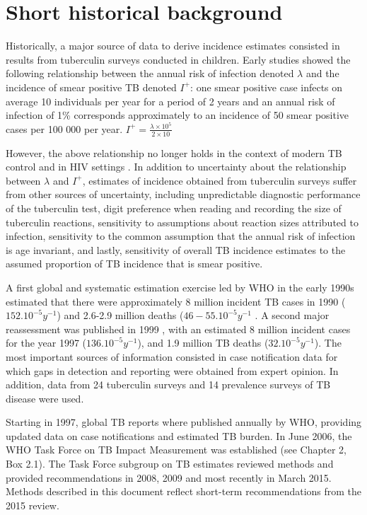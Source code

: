 \section{Short historical background}

Historically, a major source of data to derive incidence estimates consisted in results from tuberculin surveys conducted in children\cite{Styblo1985}. Early studies showed  the following relationship between the annual risk of infection denoted $\lambda$ and the incidence of smear positive TB denoted $I^+$: one smear positive case infects on average 10 individuals per year for a period of 2 years and an annual risk of infection of 1\% corresponds approximately to an incidence of 50 smear positive cases per 100 000 per year.
$\begin{equation*}
I^+ = \frac{\lambda \times 10^5}{2 \times 10}
\end{equation}$

However, the above relationship no longer holds in the context of modern TB control and in HIV settings \cite{18235886}. In addition to uncertainty about the relationship between $\lambda$ and $I^+$, estimates of incidence obtained from tuberculin surveys suffer from other sources of uncertainty, including unpredictable diagnostic performance of the tuberculin test, digit preference when reading and recording the size of tuberculin reactions, sensitivity to assumptions about reaction sizes attributed to infection, sensitivity to the common assumption that the annual risk of infection is age invariant, and lastly, sensitivity of overall TB incidence estimates to the assumed proportion of TB incidence that is smear positive. 

A first global and systematic estimation exercise led by WHO in the early 1990s estimated that there were approximately 8 million incident TB cases in 1990 ($152.10^{-5} y^{-1}$) and 2.6-2.9 million deaths ($46-55.10^{-5} y^{-1}$ \cite{1600578}. A second major reassessment was published in 1999 \cite{10517722}, with an estimated 8 million incident  cases for the year 1997 ($136.10^{-5} y^{-1}$), and 1.9 million TB deaths ($32.10^{-5} y^{-1}$). The most important sources of information consisted in case notification data for which gaps in detection and reporting were obtained from expert opinion. In addition, data from 24 tuberculin surveys and 14 prevalence surveys of TB disease were used.

Starting in 1997, global TB reports where published annually by WHO, providing updated data on case notifications and estimated TB burden. In June 2006, the WHO Task Force on TB Impact Measurement was established \cite{18201929} (see Chapter 2, Box 2.1). The Task Force subgroup on TB estimates reviewed methods and provided recommendations in 2008, 2009 and most recently in March 2015. Methods described in this document reflect short-term recommendations from the 2015 review. 




  
  
  
  
  
  
  
  
  
  
  